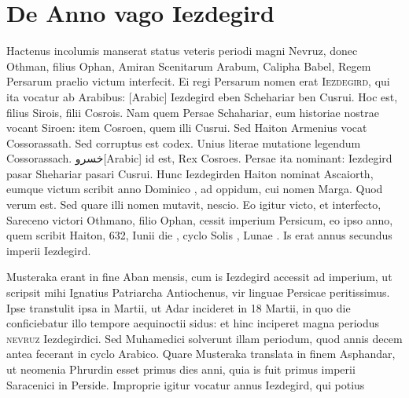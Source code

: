 \section{De Anno vago Iezdegird}
%
Hactenus incolumis manserat status veteris periodi magni
Nevruz, donec Othman, filius Ophan, Amiran Scenitarum
Arabum, Calipha Babel, Regem Persarum praelio victum interfecit.
Ei regi Persarum nomen erat \textsc{Iezdegird}, qui ita vocatur
ab Arabibus: \textarabic{}[Arabic] Iezdegird eben
Schehariar ben Cusrui. %
Hoc est, filius Sirois, filii Cosrois.
Nam quem
Persae Schahariar, eum historiae nostrae vocant Siroen: item Cosroen,
quem illi Cusrui.
Sed Haiton Armenius vocat Cossorassath.
Sed corruptus est codex. %
Unius literae mutatione legendum Cossorassach.
%
\textarabic{خسرو}[Arabic] id est, Rex Cosroes.
Persae ita nominant:
Iezdegird pasar Shehariar pasari Cusrui.
Hunc Iezdegirden Haiton
nominat Ascaiorth, eumque %
 victum scribit anno Dominico ,
ad oppidum, cui nomen Marga.
Quod verum est.
Sed quare illi
nomen mutavit, nescio.
Eo igitur victo, et interfecto, Sareceno victori
Othmano, filio Ophan, cessit imperium Persicum, eo ipso
anno, quem scribit Haiton, 632, Iunii die , cyclo Solis ,
Lunae .
Is erat annus secundus imperii Iezdegird.
\begin{table}[htbp]
  
\end{table}
%
Musteraka
erant in fine Aban mensis, cum is Iezdegird accessit ad imperium,
ut scripsit mihi Ignatius Patriarcha Antiochenus, vir linguae
Persicae peritissimus.
Ipse transtulit ipsa in  Martii,
ut Adar incideret in 18 Martii, in quo die conficiebatur illo tempore
aequinoctii sidus: et hinc inciperet magna periodus \textsc{nevruz}
Iezdegirdici.
Sed Muhamedici solverunt illam periodum,
quod annis decem antea fecerant in cyclo Arabico.
%
%
Quare Musteraka
translata in finem Asphandar, ut neomenia Phrurdin esset primus
dies anni,
quia is fuit primus
imperii Saracenici
in Perside.
Improprie igitur
vocatur annus
Iezdegird, qui potius
